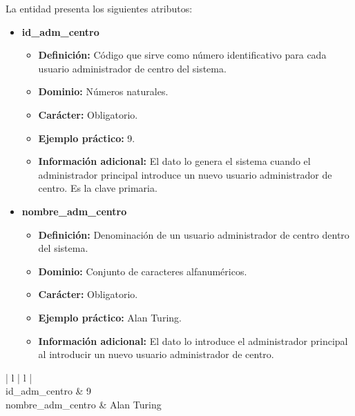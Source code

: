 \begin{description}
   \item[Descripción de los atributos] La entidad presenta los siguientes
   atributos:

   \begin{itemize}
    \item \textbf{id\_adm\_centro}
      \begin{itemize}
         \item \textbf{Definición:} Código que sirve como número identificativo
               para cada usuario administrador de centro del sistema.
         \item \textbf{Dominio:} Números naturales.
         \item \textbf{Carácter:} Obligatorio.
         \item \textbf{Ejemplo práctico:} 9.
         \item \textbf{Información adicional:} El dato lo genera el sistema
               cuando el administrador principal introduce un nuevo usuario
               administrador de centro. Es la clave primaria.
      \end{itemize}
   \item \textbf{nombre\_adm\_centro}
      \begin{itemize}
         \item \textbf{Definición:} Denominación de un usuario administrador de
         centro dentro del sistema.
         \item \textbf{Dominio:} Conjunto de caracteres alfanuméricos.
         \item \textbf{Carácter:} Obligatorio.
         \item \textbf{Ejemplo práctico:} Alan Turing.
         \item \textbf{Información adicional:} El dato lo introduce el
         administrador principal al introducir un nuevo usuario administrador
         de centro.
      \end{itemize}
   \end{itemize}

   \item[Ejemplo práctico]

   \item \begin{center}
            \begin{tabular}{ | l | l | }
            \hline
             \\
            \hline
            id\_adm\_centro & 9 \\
            \hline
            nombre\_adm\_centro & Alan Turing \\
            \hline
            \end{tabular}
         \end{center}
   \end{description}
